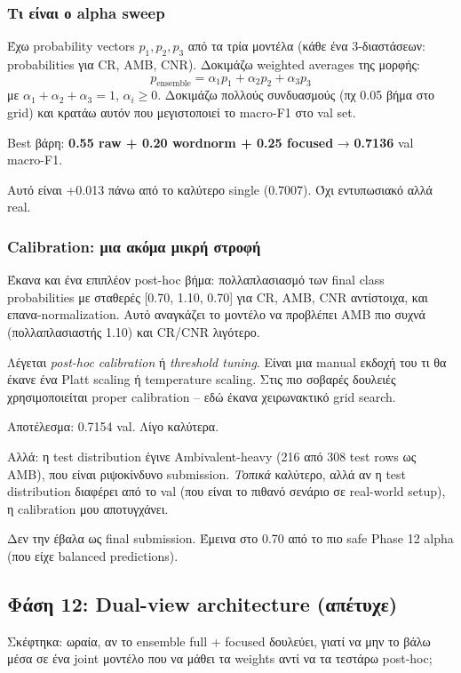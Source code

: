 \documentclass[12pt]{fphw}
\begin{document}
\subsubsection{Τι είναι ο alpha sweep}

Έχω probability vectors $p_1, p_2, p_3$ από τα τρία μοντέλα (κάθε ένα 3-διαστάσεων: probabilities για CR, AMB, CNR). Δοκιμάζω weighted averages της μορφής:
\[
p_{\text{ensemble}} = \alpha_1 p_1 + \alpha_2 p_2 + \alpha_3 p_3
\]
με $\alpha_1 + \alpha_2 + \alpha_3 = 1$, $\alpha_i \geq 0$. Δοκιμάζω πολλούς συνδυασμούς (πχ 0.05 βήμα στο grid) και κρατάω αυτόν που μεγιστοποιεί το macro-F1 στο val set.

Best βάρη: \textbf{0.55 raw + 0.20 wordnorm + 0.25 focused} → \textbf{0.7136} val macro-F1.

Αυτό είναι +0.013 πάνω από το καλύτερο single (0.7007). Όχι εντυπωσιακό αλλά real.

\subsubsection{Calibration: μια ακόμα μικρή στροφή}

Έκανα και ένα επιπλέον post-hoc βήμα: πολλαπλασιασμό των final class probabilities με σταθερές [0.70, 1.10, 0.70] για CR, AMB, CNR αντίστοιχα, και επανα-normalization. Αυτό αναγκάζει το μοντέλο να προβλέπει AMB πιο συχνά (πολλαπλασιαστής 1.10) και CR/CNR λιγότερο.

Λέγεται \emph{post-hoc calibration} ή \emph{threshold tuning}. Είναι μια manual εκδοχή του τι θα έκανε ένα Platt scaling ή temperature scaling. Στις πιο σοβαρές δουλειές χρησιμοποιείται proper calibration -- εδώ έκανα χειρωνακτικό grid search.

Αποτέλεσμα: 0.7154 val. Λίγο καλύτερα.

Αλλά: η test distribution έγινε Ambivalent-heavy (216 από 308 test rows ως AMB), που είναι ριψοκίνδυνο submission. \emph{Τοπικά} καλύτερο, αλλά αν η test distribution διαφέρει από το val (που είναι το πιθανό σενάριο σε real-world setup), η calibration μου αποτυγχάνει.

Δεν την έβαλα ως final submission. Έμεινα στο 0.70 από το πιο safe Phase 12 alpha (που είχε balanced predictions).

\subsection{Φάση 12: Dual-view architecture (απέτυχε)}

Σκέφτηκα: ωραία, αν το ensemble full + focused δουλεύει, γιατί να μην το βάλω μέσα σε ένα joint μοντέλο που να μάθει τα weights αντί να τα τεστάρω post-hoc;
\end{document}
